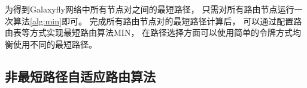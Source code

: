 
为得到Galaxyfly网络中所有节点对之间的最短路径，
只需对所有路由节点运行一次算法\ref{alg:min}即可。
完成所有路由节点对的最短路径计算后，
可以通过配置路由表等方式实现最短路由算法MIN，
在路径选择方面可以使用简单的令牌方式均衡使用不同的最短路径。

\subsection{非最短路径自适应路由算法}

